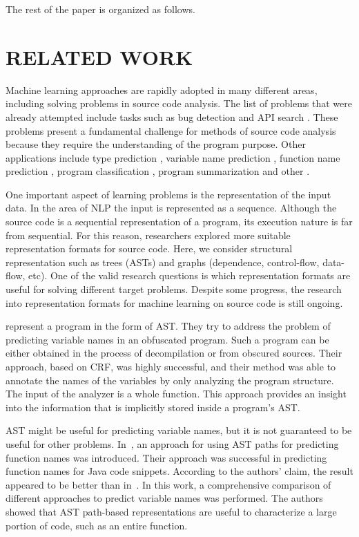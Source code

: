 \documentclass[a4paper,twoside]{article}
\begin{document}
The rest of the paper is organized as follows.

\section{\uppercase{Related Work}}

Machine learning approaches are rapidly adopted in many different areas, including solving problems in source code analysis. The list of problems that were already attempted include tasks such as bug detection \cite{Dinella2020} \cite{Wang2019} and API search \cite{Zhang2019} \cite{Wan2019}. These problems present a fundamental challenge for methods of source code analysis because they require the understanding of the program purpose. Other applications include type prediction \cite{Hellendoorn2018} \cite{Malik2019}, variable name prediction \cite{Cvitkovic2018} \cite{Bichsel2016}, function name prediction \cite{Lacomis2019} \cite{Alon2018}, program classification \cite{Ben-Nun2018} \cite{Zhou2019} \cite{Dam2019}, program summarization \cite{Fernandes2019} \cite{Shido2019} and other \cite{Nguyen2015} \cite{Yang2019} \cite{Chen2019} \cite{Drissi2018}.  

One important aspect of learning problems is the representation of the input data. In the area of NLP the input is represented as a sequence. Although the source code is a sequential representation of a program, its execution nature is far from sequential. For this reason, researchers explored more suitable representation formats for source code. Here, we consider structural representation such as trees (ASTs) and graphs (dependence, control-flow, data-flow, etc). One of the valid research questions is which representation formats are useful for solving different target problems. Despite some progress, the research into representation formats for machine learning on source code is still ongoing.

\cite{Raychev2015} represent a program in the form of AST\@. They try to address the problem of predicting variable names in an obfuscated program. Such a program can be either obtained in the process of decompilation or from obscured sources. Their approach, based on CRF, was highly successful, and their method was able to annotate the names of the variables by only analyzing the program structure. The input of the analyzer is a whole function. This approach provides an insight into the information that is implicitly stored inside a program's AST\@.

AST might be useful for predicting variable names, but it is not guaranteed to be useful for other problems. In~\cite{Alon2018}, an approach for using AST paths for predicting function names was introduced. Their approach was successful in predicting function names for Java code snippets. According to the authors' claim, the result appeared to be better than in~\cite{Raychev2015}. In this work, a comprehensive comparison of different approaches to predict variable names was performed. The authors showed that AST path-based representations are useful to characterize a large portion of code, such as an entire function. 
\end{document}
